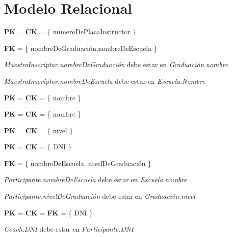 \section{Modelo Relacional}


\textbf{PK} = \textbf{CK} = \{ numeroDePlacaInstructor \}

\textbf{FK} = \{ nombreDeGraduación,nombreDeEscuela \}

\textit{MaestroInscriptor.nombreDeGraduación} debe estar en \textit{Graduación.nombre}

\textit{MaestroInscriptor.nombreDeEscuela} debe estar en \textit{Escuela.Nombre}\\


\textbf{PK} = \textbf{CK} = \{ nombre \}\\


\textbf{PK} = \textbf{CK} = \{ nombre \}\\


\textbf{PK} = \textbf{CK} = \{ nivel \}\\


\textbf{PK} = \textbf{CK} = \{ DNI \}

\textbf{FK} = \{ nombreDeEscuela, nivelDeGraduación \}

\textit{Participante.nombreDeEscuela} debe estar en \textit{Escuela.nombre}

\textit{Participante.nivelDeGraduación} debe estar en \textit{Graduación.nivel}\\


\textbf{PK} = \textbf{CK} = \textbf{FK} = \{ DNI \}

\textit{Coach.DNI} debe estar en \textit{Participante.DNI}\\


